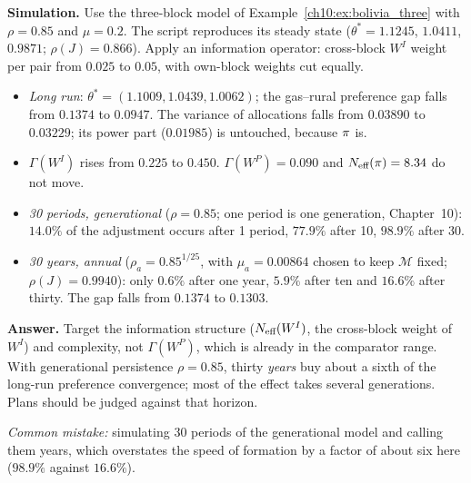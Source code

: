 \documentclass[../solutions_manual.tex]{subfiles}
\begin{document}
 \textbf{Simulation.} Use the three-block model of Example~\ref{ch10:ex:bolivia_three} with $\rho = 0.85$ and $\mu = 0.2$. The script reproduces its steady state ($\theta^* = 1.1245$, $1.0411$, $0.9871$; $\rho(J) = 0.866$). Apply an information operator: cross-block $W^I$ weight per pair from $0.025$ to $0.05$, with own-block weights cut equally.
\begin{itemize}
\item \emph{Long run}: $\theta^* = (1.1009,\allowbreak 1.0439,\allowbreak 1.0062)$; the gas--rural preference gap falls from $0.1374$ to $0.0947$. The variance of allocations falls from $0.03890$ to $0.03229$; its power part ($0.01985$) is untouched, because $\pi$ is.
\item $\Gamma(W^I)$ rises from $0.225$ to $0.450$. $\Gamma(W^P) = 0.090$ and $N_{\text{eff}}(\pi) = 8.34$ do not move.
\item \emph{30 periods, generational} ($\rho = 0.85$; one period is one generation, Chapter~10): $14.0\%$ of the adjustment occurs after 1 period, $77.9\%$ after 10, $98.9\%$ after 30.
\item \emph{30 years, annual} ($\rho_a = 0.85^{1/25}$, with $\mu_a = 0.00864$ chosen to keep $\mathcal{M}$ fixed; $\rho(J) = 0.9940$): only $0.6\%$ after one year, $5.9\%$ after ten and $16.6\%$ after thirty. The gap falls from $0.1374$ to $0.1303$.
\end{itemize}
\textbf{Answer.} Target the information structure ($N_{\text{eff}}(W^I)$, the cross-block weight of $W^I$) and complexity, not $\Gamma(W^P)$, which is already in the comparator range. With generational persistence $\rho = 0.85$, thirty \emph{years} buy about a sixth of the long-run preference convergence; most of the effect takes several generations. Plans should be judged against that horizon.

\emph{Common mistake:} simulating 30 periods of the generational model and calling them years, which overstates the speed of formation by a factor of about six here ($98.9\%$ against $16.6\%$).

\endgroup
\end{document}
